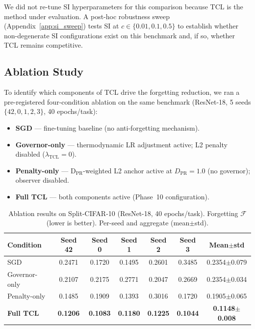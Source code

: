 We did not re-tune SI hyperparameters for this comparison because TCL is the method
under evaluation.
A post-hoc robustness sweep (Appendix~\ref{app:si_sweep}) tests SI at $c \in
\{0.01, 0.1, 0.5\}$ to establish whether non-degenerate SI configurations exist on
this benchmark and, if so, whether TCL remains competitive.


\subsection{Ablation Study}
\label{sec:ablation}

To identify which components of TCL drive the forgetting reduction, we ran a
pre-registered four-condition ablation on the same benchmark (ResNet-18, 5 seeds
$\{42, 0, 1, 2, 3\}$, 40 epochs/task):

\begin{itemize}
    \item \textbf{SGD} — fine-tuning baseline (no anti-forgetting mechanism).
    \item \textbf{Governor-only} — thermodynamic LR adjustment active; L2 penalty
          disabled ($\lambda_{\text{TCL}}=0$).
    \item \textbf{Penalty-only} — D$_{\mathrm{PR}}$-weighted L2 anchor active at
          $D_{\mathrm{PR}}=1.0$ (no governor); observer disabled.
    \item \textbf{Full TCL} — both components active (Phase~10 configuration).
\end{itemize}

\begin{table}[h]
\centering
\caption{Ablation results on Split-CIFAR-10 (ResNet-18, 40 epochs/task).
Forgetting $\mathcal{F}$ (lower is better). Per-seed and aggregate (mean$\pm$std).}
\label{tab:ablation}
\begin{tabular}{lcccccc}
\toprule
Condition & Seed 42 & Seed 0 & Seed 1 & Seed 2 & Seed 3 & Mean$\pm$std \\
\midrule
SGD             & 0.2471 & 0.1720 & 0.1495 & 0.2601 & 0.3485 & 0.2354$\pm$0.079 \\
Governor-only   & 0.2107 & 0.2175 & 0.2771 & 0.2047 & 0.2669 & 0.2354$\pm$0.034 \\
Penalty-only    & 0.1485 & 0.1909 & 0.1393 & 0.3016 & 0.1720 & 0.1905$\pm$0.065 \\
\textbf{Full TCL} & \textbf{0.1206} & \textbf{0.1083} & \textbf{0.1180} & \textbf{0.1225} & \textbf{0.1044} & \textbf{0.1148$\pm$0.008} \\
\bottomrule
\end{tabular}
\end{table}

